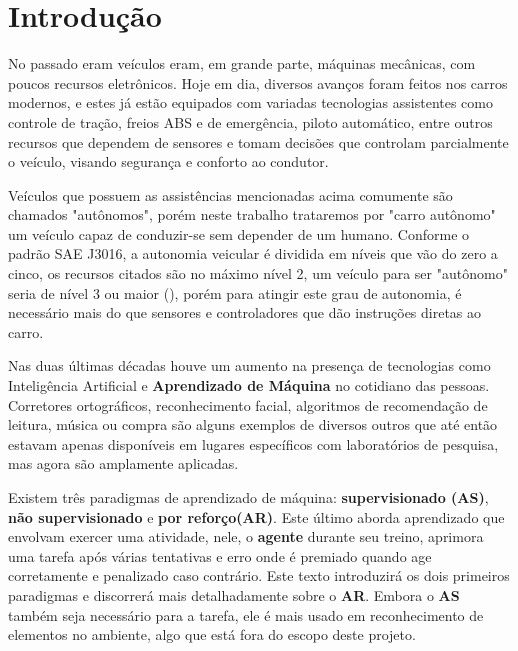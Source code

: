 
\chapter*[Introdução]{Introdução}

No passado eram veículos eram, em grande parte, máquinas mecânicas, com poucos recursos eletrônicos. Hoje em dia, diversos avanços foram feitos nos carros modernos, e estes já estão equipados com variadas tecnologias assistentes como controle de tração, freios ABS e de emergência, piloto automático, entre outros recursos que dependem de sensores e tomam decisões que controlam parcialmente o veículo, visando segurança e conforto ao condutor. 

Veículos que possuem as assistências mencionadas acima comumente são chamados "autônomos", porém neste trabalho trataremos por "carro autônomo"{} um veículo capaz de conduzir-se sem depender de um humano. Conforme o padrão SAE J3016, a autonomia veicular é dividida em níveis que vão do zero a cinco, os recursos citados são no máximo nível 2, um veículo para ser "autônomo"{} seria de nível 3 ou maior (), porém para atingir este grau de autonomia, é necessário mais do que sensores e controladores que dão instruções diretas ao carro.

Nas duas últimas décadas houve um aumento na presença de tecnologias como Inteligência Artificial e \textbf{Aprendizado de Máquina} no cotidiano das pessoas. Corretores ortográficos, reconhecimento facial, algoritmos de recomendação de leitura, música ou compra são alguns exemplos de diversos outros que até então estavam apenas disponíveis em lugares específicos com laboratórios de pesquisa, mas agora são amplamente aplicadas. 

Existem três paradigmas de aprendizado de máquina: \textbf{supervisionado (AS)}, \textbf{não supervisionado} e \textbf{por reforço(AR)}. Este último aborda aprendizado que envolvam exercer uma atividade, nele, o \textbf{agente} durante seu treino, aprimora uma tarefa após várias tentativas e erro onde é premiado quando age corretamente e penalizado caso contrário. Este texto introduzirá os dois primeiros paradigmas e discorrerá mais detalhadamente sobre o \textbf{AR}. Embora o \textbf{AS} também seja necessário para a tarefa, ele é mais usado em reconhecimento de elementos no ambiente, algo que está fora do escopo deste projeto.

